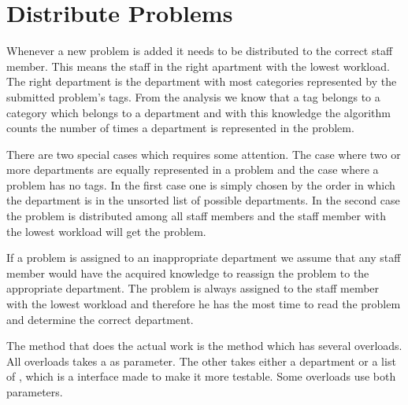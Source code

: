 \section{Distribute Problems}
\label{sec:dispro}
Whenever a new problem is added it needs to be distributed to the correct staff member.
This means the staff in the right apartment with the lowest workload. 
The right department is the department with most categories represented by the submitted problem's tags.
From the analysis we know that a tag belongs to a category which belongs to a department and with this knowledge the algorithm counts the number of times a department is represented in the problem.

There are two special cases which requires some attention. 
The case where two or more departments are equally represented in a problem and the case where a problem has no tags. 
In the first case one is simply chosen by the order in which the department is in the unsorted list of possible departments. 
In the second case the problem is distributed among all staff members and the staff member with the lowest workload will get the problem. 

If a problem is assigned to an inappropriate department we assume that any staff member would have the acquired knowledge to reassign the problem to the appropriate department. 
The problem is always assigned to the staff member with the lowest workload and therefore he has the most time to read the problem and determine the correct department.

The method that does the actual work is the  method which has several overloads. 
All overloads takes a  as parameter. 
The other takes either a department or a list of , which is a  interface made to make it more testable. 
Some overloads use both parameters.



